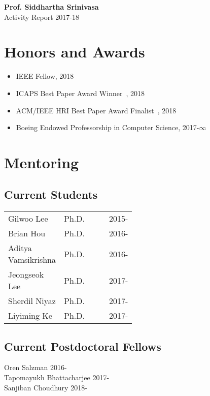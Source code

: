 \documentclass[10pt]{article}
\begin{document}
\pagestyle{empty} %

\par{\centering
		{\bf\LARGE Prof. Siddhartha Srinivasa}\\
		{\Large Activity Report 2017-18}
\bigskip\par}



\section{Honors and Awards}
\begin{itemize}
\addtolength{\itemsep}{-0.5\baselineskip}
\item IEEE Fellow, 2018
\item ICAPS Best Paper Award Winner~\cite{haghtalab2018laziness}, 2018
\item ACM/IEEE HRI Best Paper Award Finalist~\cite{chen2018trust}, 2018
\item Boeing Endowed Professorship in Computer Science, 2017-$\infty$
\end{itemize}

\section{Mentoring} 
\subsection{Current Students}
\vspace{-1em}
\begin{center}
\begin{tabular}{lrlp{0.5\linewidth}l}
Gilwoo Lee & Ph.D. &  & & 2015-\\
Brian Hou & Ph.D. & & & 2016-\\
Aditya Vamsikrishna & Ph.D. & & & 2016-\\
Jeongseok Lee & Ph.D. & & & 2017-\\
Sherdil Niyaz & Ph.D. & & & 2017-\\
Liyiming Ke & Ph.D. & & & 2017-\\
\end{tabular}
\end{center}

\subsection{Current Postdoctoral Fellows}
\vspace{-1em}
\noindent
Oren Salzman \hfill 2016-\\
Tapomayukh Bhattacharjee \hfill 2017-\\
Sanjiban Choudhury \hfill 2018-\\
\end{document}
